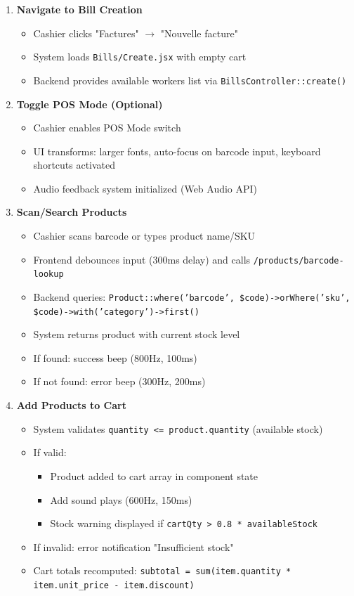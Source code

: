 \begin{enumerate}[leftmargin=*]
    \item \textbf{Navigate to Bill Creation}
    \begin{itemize}
        \item Cashier clicks "Factures" $\rightarrow$ "Nouvelle facture"
        \item System loads \texttt{Bills/Create.jsx} with empty cart
        \item Backend provides available workers list via \texttt{BillsController::create()}
    \end{itemize}
    
    \item \textbf{Toggle POS Mode (Optional)}
    \begin{itemize}
        \item Cashier enables POS Mode switch
        \item UI transforms: larger fonts, auto-focus on barcode input, keyboard shortcuts activated
        \item Audio feedback system initialized (Web Audio API)
    \end{itemize}
    
    \item \textbf{Scan/Search Products}
    \begin{itemize}
        \item Cashier scans barcode or types product name/SKU
        \item Frontend debounces input (300ms delay) and calls \texttt{/products/barcode-lookup}
        \item Backend queries: \texttt{Product::where('barcode', \$code)->orWhere('sku', \$code)->with('category')->first()}
        \item System returns product with current stock level
        \item If found: success beep (800Hz, 100ms)
        \item If not found: error beep (300Hz, 200ms)
    \end{itemize}
    
    \item \textbf{Add Products to Cart}
    \begin{itemize}
        \item System validates \texttt{quantity <= product.quantity} (available stock)
        \item If valid:
        \begin{itemize}
            \item Product added to cart array in component state
            \item Add sound plays (600Hz, 150ms)
            \item Stock warning displayed if \texttt{cartQty > 0.8 * availableStock}
        \end{itemize}
        \item If invalid: error notification "Insufficient stock"
        \item Cart totals recomputed: \texttt{subtotal = sum(item.quantity * item.unit\_price - item.discount)}
    \end{itemize}
    

\end{enumerate}
